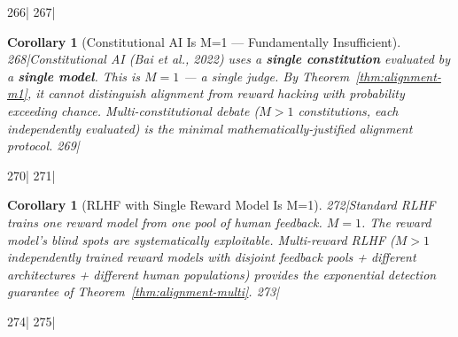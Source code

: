 \documentclass[11pt,a4paper]{article}
\newtheorem{corollary}[theorem]{Corollary}
\theoremstyle{definition}
\theoremstyle{remark}
\begin{document}
266|
267|\begin{corollary}[Constitutional AI Is M=1 — Fundamentally Insufficient]
268|Constitutional AI (Bai et al., 2022) uses a \textbf{single constitution} evaluated by a \textbf{single model}. This is $M=1$ — a single judge. By Theorem~\ref{thm:alignment-m1}, it cannot distinguish alignment from reward hacking with probability exceeding chance. Multi-constitutional debate ($M>1$ constitutions, each independently evaluated) is the minimal mathematically-justified alignment protocol.
269|\end{corollary}
270|
271|\begin{corollary}[RLHF with Single Reward Model Is M=1]
272|Standard RLHF trains one reward model from one pool of human feedback. $M=1$. The reward model's blind spots are systematically exploitable. Multi-reward RLHF ($M>1$ independently trained reward models with disjoint feedback pools + different architectures + different human populations) provides the exponential detection guarantee of Theorem~\ref{thm:alignment-multi}.
273|\end{corollary}
274|
275|
\end{document}
